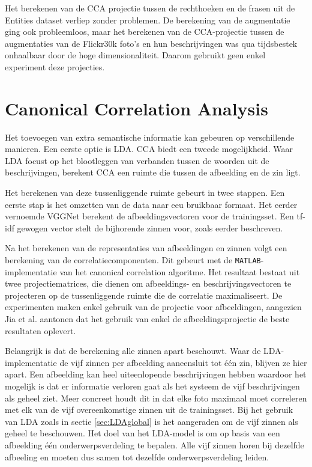 Het berekenen van de CCA projectie tussen de rechthoeken en de frasen uit de Entities dataset verliep zonder problemen. De berekening van de augmentatie ging ook probleemloos, maar het berekenen van de CCA-projectie tussen de augmentaties van de Flickr30k foto's en hun beschrijvingen was qua tijdsbestek onhaalbaar door de hoge dimensionaliteit. Daarom gebruikt geen enkel experiment deze projecties. 



\section{Canonical Correlation Analysis}
Het toevoegen van extra semantische informatie kan gebeuren op verschillende manieren. Een eerste optie is LDA. CCA biedt een tweede mogelijkheid. Waar LDA focust op het blootleggen van verbanden tussen de woorden uit de beschrijvingen, berekent CCA een ruimte die tussen de afbeelding en de zin ligt.

Het berekenen van deze tussenliggende ruimte gebeurt in twee stappen. Een eerste stap is het omzetten van de data naar eeu bruikbaar formaat. Het eerder vernoemde VGGNet berekent de afbeeldingsvectoren voor de trainingsset. Een tf-idf gewogen vector stelt de bijhorende zinnen voor, zoals eerder beschreven. 

Na het berekenen van de representaties van afbeeldingen en zinnen volgt een berekening van de correlatiecomponenten. Dit gebeurt met de \texttt{MATLAB}-implementatie van het canonical correlation algoritme. Het resultaat bestaat uit twee projectiematrices, die dienen om afbeeldings- en beschrijvingsvectoren te projecteren op de tussenliggende ruimte die de correlatie maximaliseert. De experimenten maken enkel gebruik van de projectie voor afbeeldingen, aangezien Jia et al.\cite{Fernando2015} aantonen dat het gebruik van enkel de afbeeldingsprojectie de beste resultaten oplevert.

Belangrijk is dat de berekening alle zinnen apart beschouwt. Waar de LDA-implementatie de vijf zinnen per afbeelding aaneensluit tot \'e\'en zin, blijven ze hier apart. Een afbeelding kan heel uiteenlopende beschrijvingen hebben waardoor het mogelijk is dat er informatie verloren gaat als het systeem de vijf beschrijvingen als geheel ziet. Meer concreet houdt dit in dat elke foto maximaal moet correleren met elk van de vijf overeenkomstige zinnen uit de trainingsset. Bij het gebruik van LDA zoals in sectie \ref{sec:LDAglobal} is het aangeraden om de vijf zinnen als geheel te beschouwen. Het doel van het LDA-model is om op basis van een afbeelding \'e\'en onderwerpsverdeling te bepalen. Alle vijf zinnen horen bij dezelfde afbeeling en moeten dus samen tot dezelfde onderwerpsverdeling leiden.

